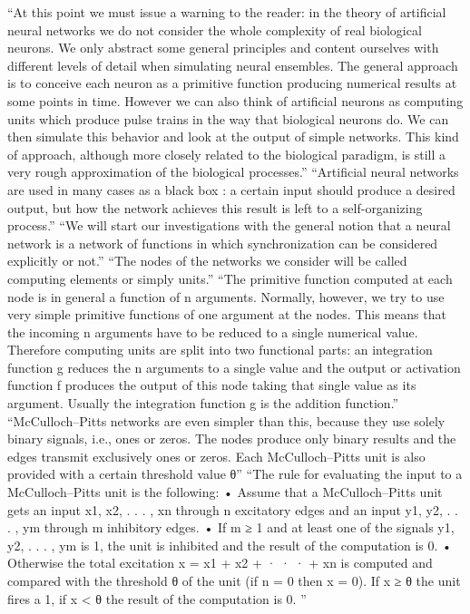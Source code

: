 \documentclass{automatextcc}
\begin{document}
``At this point we must issue a warning to the reader: in the theory of artificial neural networks we do not consider the whole complexity of real biological neurons. We only abstract some general principles and content ourselves with different levels of detail when simulating neural ensembles. The general approach is to conceive each neuron as a primitive function producing numerical results at some points in time. However we can also think of artificial neurons as computing units which produce pulse trains in the way that biological neurons do. We can then simulate this behavior and look at the output of simple networks. This kind of approach, although more closely related to the biological paradigm, is still a very rough approximation of the biological processes.''
``Artificial neural networks are used in many cases as a black box : a certain input should produce a desired output, but how the network achieves this result is left to a self-organizing process.''
``We will start our investigations with the general notion that a neural network is a network of functions in which synchronization can be considered explicitly or not.''
``The nodes of the networks we consider will be called computing elements or simply units.''
``The primitive function computed at each node is in general a function of n arguments. Normally, however, we try to use very simple primitive functions of one argument at the nodes. This means that the incoming n arguments have to be reduced to a single numerical value. Therefore computing units are split into two functional parts: an integration function g reduces the n arguments to a single value and the output or activation function f produces the output of this node taking that single value as its argument. Usually the integration function g is the addition function.''
``McCulloch–Pitts networks are even simpler than this, because they use solely binary signals, i.e., ones or zeros. The nodes produce only binary results and the edges transmit exclusively ones or zeros. Each McCulloch–Pitts unit is also provided with a certain threshold value θ''
``The rule for evaluating the input to a McCulloch–Pitts unit is the following:
    • Assume that a McCulloch–Pitts unit gets an input x1, x2, . . . , xn through n excitatory edges and an input y1, y2, . . . , ym through m inhibitory edges.
    • If m ≥ 1 and at least one of the signals y1, y2, . . . , ym is 1, the unit is inhibited and the result of the computation is 0.
    • Otherwise the total excitation x = x1 + x2 + · · · + xn is computed and compared with the threshold θ of the unit (if n = 0 then x = 0). If x ≥ θ the unit fires a 1, if x < θ the result of the computation is 0.
''
\end{document}
